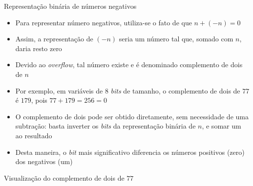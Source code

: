 \begin{frame}[fragile]{Representação binária de números negativos}

    \begin{itemize}
        \item Para representar número negativos, utiliza-se o fato de que $n + (-n) = 0$

        \item Assim, a representação de $(-n)$ seria um número tal que, somado com $n$, daria
            resto zero

        \item Devido ao \textit{overflow}, tal número existe e é denominado complemento de 
            dois de $n$

        \item Por exemplo, em variáveis de 8 \textit{bits} de tamanho, o complemento de dois 
            de $77$ é $179$, pois $77 + 179 = 256 = 0$

        \item O complemento de dois pode ser obtido diretamente, sem necessidade de uma subtração:
            basta inverter os \textit{bits} da representação binária de $n$, e somar um ao
            resultado

        \item Desta maneira, o \textit{bit} mais significativo diferencia os números positivos
        (zero) dos negativos (um)

    \end{itemize}

\end{frame}

\begin{frame}[fragile]{Visualização do complemento de dois de $77$}


\end{frame}


